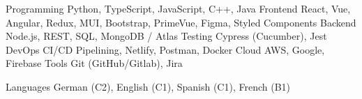 

\begin{cvskills}

  \cvskill
    {Programming} %
    {Python, TypeScript, JavaScript, C++, Java} %
  \cvskill
    {Frontend} %
    {React, Vue, Angular, Redux, MUI, Bootstrap, PrimeVue, Figma, Styled Components} %
  \cvskill
    {Backend} %
    {Node.js, REST, SQL, MongoDB / Atlas} %
  \cvskill
    {Testing} %
    {Cypress (Cucumber), Jest} %
  \cvskill
    {DevOps} %
    {CI/CD Pipelining, Netlify, Postman, Docker} %
  \cvskill
    {Cloud} %
    {AWS, Google, Firebase} %
  \cvskill
    {Tools} %
    {Git (GitHub/Gitlab), Jira} %

  \cvskill
    {Languages} %
    {German (C2), English (C1), Spanish (C1), French (B1)} %

\end{cvskills}
